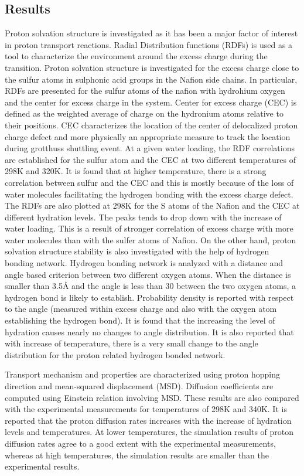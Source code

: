 \documentclass{article}
\begin{document}
\subsection{Results}
\label{sec-3-3}
Proton solvation structure is investigated as it has been a major factor of interest in proton transport reactions. Radial Distribution functions (RDFs) is used as a tool to characterize the environment around the excess charge during the transition. Proton solvation structure is investigated for the excess charge close to the sulfur atoms in sulphonic acid groups in the Nafion side chains. In particular, RDFs are presented for the sulfur atoms of the nafion with hydrohium oxygen and the center for excess charge in the system. Center for excess charge (CEC) is defined as the weighted average of charge on the hydronium atoms relative to their positions. CEC characterizes the location of the center of delocalized proton charge defect and more physically an appropriate measure to track the location during grotthuss shuttling event. At a given water loading, the RDF correlations are established for the sulfur atom and the CEC at two different temperatures of 298K and 320K. It is found that at higher temperature, there is a strong correlation between sulfur and the CEC and this is mostly because of the loss of water molecules facilitating the hydrogen bonding with the excess charge defect. The RDFs are also plotted at 298K for the S atoms of the Nafion and the CEC at different hydration levels. The peaks tends to drop down with the increase of water loading. This is a result of stronger correlation of excess charge with more water molecules than with the sulfer atoms of Nafion. On the other hand, proton solvation structure stability is also investigated with the help of hydrogen bonding network. Hydrogen bonding network is analyzed with a distance and angle based criterion between two different oxygen atoms. When the distance is smaller than 3.5\AA{} and the angle is less than 30\textdegree{} between the two oxygen atoms, a hydrogen bond is likely to establish. Probability density is reported with respect to the angle (measured within excess charge and also with the oxygen atom establishing the hydrogen bond). It is found that the increasing the level of hydration causes nearly no changes to angle distribution. It is also reported that with increase of temperature, there is a very small change to the angle distribution for the proton related hydrogen bonded network.

Transport mechanism and properties are characterized using proton hopping direction and mean-squared displacement (MSD). Diffusion coefficients are computed using Einstein relation involving MSD. These results are also compared with the experimental measurements for temperatures of 298K and 340K. It is reported that the proton diffusion rates increases with the increase of hydration levels and temperatures. At lower temperatures, the simulation results of proton diffusion rates agree to a good extent with the experimental measurements, whereas at high temperatures, the simulation results are smaller than the experimental results. 
\end{document}
